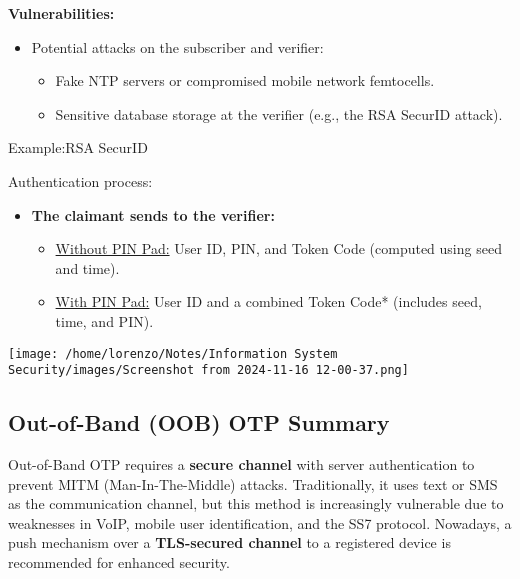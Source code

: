 \begin{customquote}
    \textbf{Vulnerabilities:}
    \begin{itemize}
        \item Potential attacks on the subscriber and verifier:
        \begin{itemize}
            \item Fake NTP servers or compromised mobile network femtocells.
            \item Sensitive database storage at the verifier (e.g., the RSA SecurID attack).
        \end{itemize}
    \end{itemize}
\end{customquote}

\begin{quotebox}[colframe=blue!10!white, colback=blue!5!white]{Example:RSA SecurID}
    \begin{minipage}{0.6\textwidth}
        Authentication process:
        \begin{itemize}
            \item \textbf{The claimant sends to the verifier:}
            \begin{itemize}
                \item \underline{Without PIN Pad:} User ID, PIN, and Token Code (computed using seed and time).
                \item \underline{With PIN Pad:} User ID and a combined Token Code* (includes seed, time, and PIN).
            \end{itemize}
        \end{itemize}
    \end{minipage} 
    \hspace{1cm}
    \begin{minipage}{0.3\textwidth}
        \centering
        \texttt{[image: /home/lorenzo/Notes/Information System Security/images/Screenshot from 2024-11-16 12-00-37.png]}
    \end{minipage}
\end{quotebox}

\subsection{Out-of-Band (OOB) OTP Summary}
Out-of-Band OTP requires a \textbf{secure channel} with server authentication 
to prevent MITM (Man-In-The-Middle) attacks. Traditionally, it uses text or 
SMS as the communication channel, but this method is increasingly vulnerable 
due to weaknesses in VoIP, mobile user identification, and the SS7 protocol. 
Nowadays, a push mechanism over a \textbf{TLS-secured channel} to a registered device is recommended for enhanced security.


